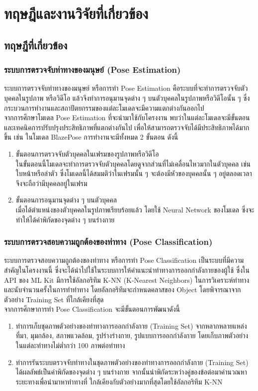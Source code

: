 \chapter{ทฤษฎีและงานวิจัยที่เกี่ยวข้อง}
\section{ทฤษฎีที่เกี่ยวข้อง}
\subsection{ระบบการตรวจจับท่าทางของมนุษย์ (Pose Estimation)}
ระบบการตรวจจับท่าทางของมนุษย์ หรือการทำ Pose Estimation คือระบบที่จะทำการตรวจจับตัวบุคคลในรูปภาพ หรือวิดีโอ แล้วจึงทำการอนุมานจุดต่าง ๆ บนตัวบุคคลในรูปภาพหรือวิดีโอนั้น ๆ ซึ่งกระบวนการทำงานและสถาปัตยกรรมของแต่ละโมเดลจะมีความแตกต่างกันออกไป
\\\indent
จากการศึกษาโมเดล Pose Estimation ที่จะนำมาใช้กับโครงงาน พบว่าในแต่ละโมเดลจะมีขั้นตอนและเทคนิคการปรับปรุงประสิทธิภาพที่แตกต่างกันไป เพื่อให้สามารถตรวจจับได้มีประสิทธิภาพได้มากขึ้น เช่น ในโมเดล BlazePose การทำงานจะมีทั้งหมด 2 ขั้นตอน ดังนี้

\begin{enumerate}
    \item ขั้นตอนการตรวจจับตัวบุคคลในเฟรมของรูปภาพหรือวิดีโอ \\ในขั้นตอนนี้โมเดลจะทำการตรวจจับตัวบุคคลโดยดูจากส่วนที่ไม่เคลื่อนไหวมากในตัวบุคคล เช่น ใบหน้าหรือลำตัว ซึ่งโมเดลนี้ได้สมมติว่าในเฟรมนั้น ๆ จะต้องมีหัวของบุคคลนั้น ๆ อยู่ตลอดเวลาจึงจะถือว่ามีบุคคลอยู่ในเฟรม
    \item ขั้นตอนการอนุมานจุดต่าง ๆ บนตัวบุคคล\\เมื่อได้ตำแหน่งของตัวบุคคลในรูปภาพเรียบร้อยแล้ว โดยใช้ Neural Network ของโมเดล ซึ่งจะทำให้ได้ค่าพิกัดของจุดต่าง ๆ บนร่างกาย
\end{enumerate}

\subsection{ระบบการตรวจสอบความถูกต้องของท่าทาง (Pose Classification)}
ระบบการตรวจสอบความถูกต้องของท่าทาง หรือการทำ Pose Classification เป็นระบบที่มีความสำคัญในโครงงานนี้ ซึ่งจะได้นำไปใช้ในระบบการให้คำแนะนำท่าทางการออกกำลังกายของผู้ใช้ ซึ่งใน API ของ ML Kit มีการใช้อัลกอริทึม K-NN (K-Nearest Neighbors) ในการวิเคราะห์ท่าทางและนับจำนวนครั้งในการทำท่าทาง โดยอัลกอริทึมจะกำหนดคลาสของ Object โดยพิจารณาจากตัวอย่าง Training Set ที่ใกล้เคียงที่สุด
\\\indent
จากการศึกษาการทำ Pose Classification จะมีขั้นตอนการพัฒนาดังนี้
\begin{enumerate}
    \item ทำการเก็บชุดภาพตัวอย่างของท่าทางการออกกำลังกาย (Training Set) จากหลากหลายแหล่งที่มา, มุมกล้อง, สภาพแวดล้อม, รูปร่างร่างกาย, รูปแบบการออกกำลังกาย โดยเก็บภาพตัวอย่างในแต่ละท่าทางไม่ต่ำกว่า 100 ภาพต่อท่าทาง
    \item ทำการรันระบบตรวจจับท่าทางในชุดภาพตัวอย่างของท่าทางการออกกำลังกาย (Training Set) ได้ผลลัพธ์เป็นค่าพิกัดของจุดต่าง ๆ บนร่างกาย จากนั้นนำพิกัดระหว่างคู่ของข้อต่อมาคำนวณหาระยะทางเพื่อนำมาหาท่าทางที่
    ใกล้เคียงกับตัวอย่างมากที่สุดโดยใช้อัลกอริทึม K-NN
\end{enumerate}


